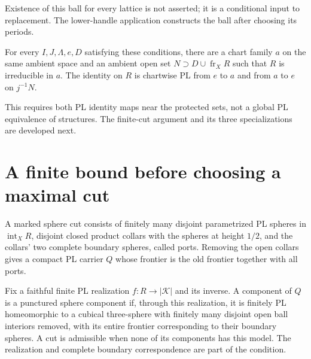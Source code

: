 Existence of this ball for every lattice is not asserted; it is a
conditional input to replacement. The lower-handle application constructs
the ball after choosing its periods.

\begin{theorem}
\label{thm:protected-prime-replacement}
For every $I,J,\Lambda,e,D$ satisfying these conditions, there are a
chart family $a$ on the same ambient space and an ambient open set
$N\supset D\cup\operatorname{fr}_X R$ such that $R$ is irreducible in $a$.
The identity on $R$ is chartwise PL from $e$ to $a$ and from $a$ to $e$
on $j^{-1}N$.
\end{theorem}

This requires both PL identity maps near the protected sets, not a global
PL equivalence of structures. The finite-cut argument and its three
specializations are developed next.

\section{A finite bound before choosing a maximal cut}
\label{sec:prime-replacement}

\begin{definition}
\label{def:marked-sphere-cut}
A marked sphere cut consists of finitely many disjoint parametrized PL
spheres in $\operatorname{int}_X R$, disjoint closed product collars with
the spheres at height $1/2$, and the collars' two complete boundary
spheres, called ports. Removing the open collars gives a compact PL
carrier $Q$ whose frontier is the old frontier together with all ports.
\end{definition}

Fix a faithful finite PL realization $f:R\to|\mathcal K|$ and its inverse.
A component of $Q$ is a punctured sphere component if, through this
realization, it is finitely PL homeomorphic to a cubical three-sphere with
finitely many disjoint open ball interiors removed, with its entire
frontier corresponding to their boundary spheres. A cut is admissible
when none of its components has this model. The realization and complete
boundary correspondence are part of the condition.

